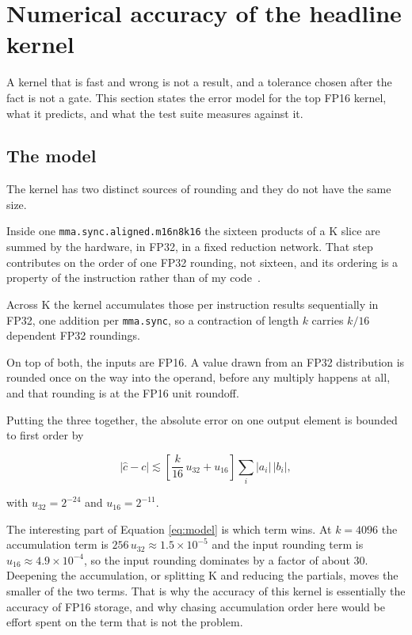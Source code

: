 \section{Numerical accuracy of the headline kernel}
\label{sec:accuracy}

A kernel that is fast and wrong is not a result, and a tolerance chosen after the
fact is not a gate. This section states the error model for the top FP16 kernel,
what it predicts, and what the test suite measures against it.

\subsection{The model}

The kernel has two distinct sources of rounding and they do not have the same
size.

Inside one \texttt{mma.sync.aligned.m16n8k16} the sixteen products of a K slice
are summed by the hardware, in FP32, in a fixed reduction network. That step
contributes on the order of one FP32 rounding, not sixteen, and its ordering is a
property of the instruction rather than of my code~\cite{markidis2018}.

Across K the kernel accumulates those per instruction results sequentially in
FP32, one addition per \texttt{mma.sync}, so a contraction of length $k$ carries
$k/16$ dependent FP32 roundings.

On top of both, the inputs are FP16. A value drawn from an FP32 distribution is
rounded once on the way into the operand, before any multiply happens at all, and
that rounding is at the FP16 unit roundoff.

Putting the three together, the absolute error on one output element is bounded to
first order by

\begin{equation}
\left| \hat{c} - c \right| \lesssim
\left[ \frac{k}{16}\, u_{32} + u_{16} \right] \sum_{i} |a_i|\,|b_i|,
\label{eq:model}
\end{equation}

with $u_{32} = 2^{-24}$ and $u_{16} = 2^{-11}$.

The interesting part of Equation \ref{eq:model} is which term wins. At
$k = 4096$ the accumulation term is $256 \, u_{32} \approx 1.5 \times 10^{-5}$ and
the input rounding term is $u_{16} \approx 4.9 \times 10^{-4}$, so the input
rounding dominates by a factor of about 30. Deepening the accumulation, or
splitting K and reducing the partials, moves the smaller of the two terms. That is
why the accuracy of this kernel is essentially the accuracy of FP16 storage, and
why chasing accumulation order here would be effort spent on the term that is not
the problem.

